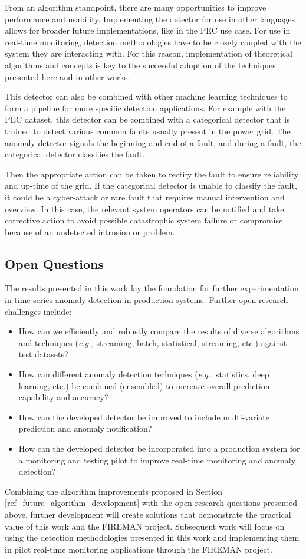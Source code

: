 From an algorithm standpoint, there are many opportunities to improve performance and usability. Implementing the detector for use in other languages allows for broader future implementations, like in the PEC use case. For use in real-time monitoring, detection methodologies have to be closely coupled with the system they are interacting with. For this reason, implementation of theoretical algorithms and concepts is key to the successful adoption of the techniques presented here and in other works.

This detector can also be combined with other machine learning techniques to form a pipeline for more specific detection applications. For example with the PEC dataset, this detector can be combined with a categorical detector that is trained to detect various common faults usually present in the power grid. The anomaly detector signals the beginning and end of a fault, and during a fault, the categorical detector classifies the fault.

Then the appropriate action can be taken to rectify the fault to ensure reliability and up-time of the grid. If the categorical detector is unable to classify the fault, it could be a cyber-attack or rare fault that requires manual intervention and overview. In this case, the relevant system operators can be notified and take corrective action to avoid possible catastrophic system failure or compromise because of an undetected intrusion or problem. 

\subsection{Open Questions}
The results presented in this work lay the foundation for further experimentation in time-series anomaly detection in production systems. Further open research challenges include: 

\begin{itemize}
    \item How can we efficiently and robustly compare the results of diverse algorithms and techniques (\textit{e.g.,} streaming, batch, statistical, streaming, etc.) against test datasets?
    \item How can different anomaly detection techniques (\textit{e.g.,} statistics, deep learning, etc.) be combined (ensembled) to increase overall prediction capability and accuracy?
    \item How can the developed detector be improved to include multi-variate prediction and anomaly notification?
    \item How can the developed detector be incorporated into a production system for a monitoring and testing pilot to improve real-time monitoring and anomaly detection? 
\end{itemize}

Combining the algorithm improvements proposed in Section \ref{ref_future_algorithm_development} with the open research questions presented above, further development will create solutions that demonstrate the practical value of this work and the FIREMAN project. Subsequent work will focus on using the detection methodologies presented in this work and implementing them in pilot real-time monitoring applications through the FIREMAN project.